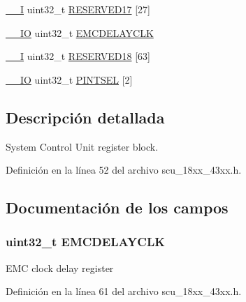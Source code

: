 \begin{DoxyCompactItemize}
\hyperlink{core__sc300_8h_af63697ed9952cc71e1225efe205f6cd3}{\+\_\+\+\_\+I} uint32\+\_\+t \hyperlink{struct_l_p_c___s_c_u___t_a323d6d64e5b0ed3b3dc69e6d2ab37bf6}{R\+E\+S\+E\+R\+V\+E\+D17} \mbox{[}27\mbox{]}
\item 
\hyperlink{core__sc300_8h_aec43007d9998a0a0e01faede4133d6be}{\+\_\+\+\_\+\+IO} uint32\+\_\+t \hyperlink{struct_l_p_c___s_c_u___t_a4deeed860bc248d704a0bd1c2247a990}{E\+M\+C\+D\+E\+L\+A\+Y\+C\+LK}
\item 
\hyperlink{core__sc300_8h_af63697ed9952cc71e1225efe205f6cd3}{\+\_\+\+\_\+I} uint32\+\_\+t \hyperlink{struct_l_p_c___s_c_u___t_a78acd8160a6a980743e7c5d0c3253eee}{R\+E\+S\+E\+R\+V\+E\+D18} \mbox{[}63\mbox{]}
\item 
\hyperlink{core__sc300_8h_aec43007d9998a0a0e01faede4133d6be}{\+\_\+\+\_\+\+IO} uint32\+\_\+t \hyperlink{struct_l_p_c___s_c_u___t_a8ef8b92ccfb8598c38506400a44c1d4e}{P\+I\+N\+T\+S\+EL} \mbox{[}2\mbox{]}
\end{DoxyCompactItemize}


\subsection{Descripción detallada}
System Control Unit register block. 

Definición en la línea 52 del archivo scu\+\_\+18xx\+\_\+43xx.\+h.



\subsection{Documentación de los campos}
\subsubsection[{\texorpdfstring{E\+M\+C\+D\+E\+L\+A\+Y\+C\+LK}{EMCDELAYCLK}}]{ uint32\+\_\+t E\+M\+C\+D\+E\+L\+A\+Y\+C\+LK}\hypertarget{struct_l_p_c___s_c_u___t_a4deeed860bc248d704a0bd1c2247a990}{}\label{struct_l_p_c___s_c_u___t_a4deeed860bc248d704a0bd1c2247a990}
E\+MC clock delay register 

Definición en la línea 61 del archivo scu\+\_\+18xx\+\_\+43xx.\+h.

